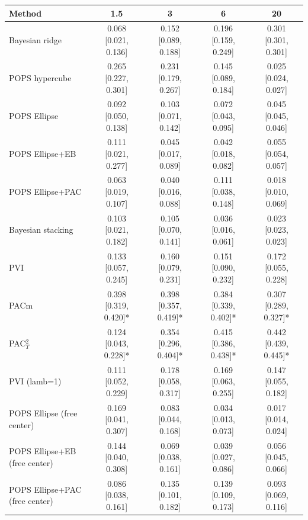\begin{tabular}{lcccc}
\toprule
Method & 1.5 & 3 & 6 & 20 \\
\midrule
Bayesian ridge & 0.068 {\scriptsize[0.021, 0.136]} & 0.152 {\scriptsize[0.089, 0.188]} & 0.196 {\scriptsize[0.159, 0.249]} & 0.301 {\scriptsize[0.301, 0.301]} \\
POPS hypercube & 0.265 {\scriptsize[0.227, 0.301]} & 0.231 {\scriptsize[0.179, 0.267]} & 0.145 {\scriptsize[0.089, 0.184]} & 0.025 {\scriptsize[0.024, 0.027]} \\
POPS Ellipse & 0.092 {\scriptsize[0.050, 0.138]} & 0.103 {\scriptsize[0.071, 0.142]} & 0.072 {\scriptsize[0.043, 0.095]} & 0.045 {\scriptsize[0.045, 0.046]} \\
POPS Ellipse+EB & 0.111 {\scriptsize[0.021, 0.277]} & 0.045 {\scriptsize[0.017, 0.089]} & 0.042 {\scriptsize[0.018, 0.082]} & 0.055 {\scriptsize[0.054, 0.057]} \\
POPS Ellipse+PAC & 0.063 {\scriptsize[0.019, 0.107]} & 0.040 {\scriptsize[0.016, 0.088]} & 0.111 {\scriptsize[0.038, 0.148]} & 0.018 {\scriptsize[0.010, 0.069]} \\
Bayesian stacking & 0.103 {\scriptsize[0.021, 0.182]} & 0.105 {\scriptsize[0.070, 0.141]} & 0.036 {\scriptsize[0.016, 0.061]} & 0.023 {\scriptsize[0.023, 0.023]} \\
PVI & 0.133 {\scriptsize[0.057, 0.245]} & 0.160 {\scriptsize[0.079, 0.231]} & 0.151 {\scriptsize[0.090, 0.232]} & 0.172 {\scriptsize[0.055, 0.228]} \\
PACm & 0.398 {\scriptsize[0.319, 0.420]}* & 0.398 {\scriptsize[0.357, 0.419]}* & 0.384 {\scriptsize[0.339, 0.402]}* & 0.307 {\scriptsize[0.289, 0.327]}* \\
PAC$^2_T$ & 0.124 {\scriptsize[0.043, 0.228]}* & 0.354 {\scriptsize[0.296, 0.404]}* & 0.415 {\scriptsize[0.386, 0.438]}* & 0.442 {\scriptsize[0.439, 0.445]}* \\
PVI (lamb=1) & 0.111 {\scriptsize[0.052, 0.229]} & 0.178 {\scriptsize[0.058, 0.317]} & 0.169 {\scriptsize[0.063, 0.255]} & 0.147 {\scriptsize[0.055, 0.182]} \\
POPS Ellipse (free center) & 0.169 {\scriptsize[0.041, 0.307]} & 0.083 {\scriptsize[0.044, 0.168]} & 0.034 {\scriptsize[0.013, 0.073]} & 0.017 {\scriptsize[0.014, 0.024]} \\
POPS Ellipse+EB (free center) & 0.144 {\scriptsize[0.040, 0.308]} & 0.069 {\scriptsize[0.038, 0.161]} & 0.039 {\scriptsize[0.027, 0.086]} & 0.056 {\scriptsize[0.045, 0.066]} \\
POPS Ellipse+PAC (free center) & 0.086 {\scriptsize[0.038, 0.161]} & 0.135 {\scriptsize[0.101, 0.182]} & 0.139 {\scriptsize[0.109, 0.173]} & 0.093 {\scriptsize[0.069, 0.116]} \\
\bottomrule
\end{tabular}

